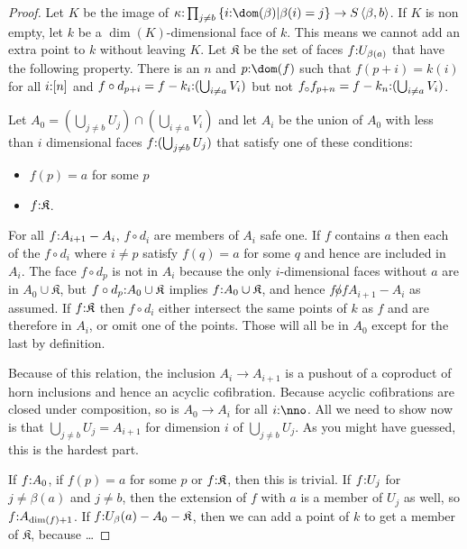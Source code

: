 \documentclass[csh.tex]{subfiles}
\begin{document}
\begin{proof}
Let $K$ be the image of $\kappa\of \prod_{j\neq b}\set{i\of\dom(\beta)|\beta(i)=j} \to S\tuplet{\beta,b}$. If $K$ is non empty, let $k$ be a $\dim(K)$-dimensional face of $k$. This means we cannot add an extra point to $k$ without leaving $K$.
Let $\mathfrak K$ be the set of faces $f\mathord : U_{\beta(a)}$ that have the following property. There is an $n$ and $p\of \dom(f)$ such that 
$f(p+i) = k(i)$ for all $i\mathord :[n]$ and
$f\circ d_{p+i} = f - k_i \mathord : (\bigcup_{i\neq a} V_i)$ but not $f_\circ f_{p+n} = f - k_n \mathord : (\bigcup_{i\neq a} V_i)$.

Let $A_0 = (\bigcup_{j\neq b} U_j) \cap (\bigcup_{i\neq a} V_i)$ and let $A_{i}$ be the union of $A_0$ with less than $i$ dimensional faces $f\mathord : (\bigcup_{j\neq b} U_j)$ that satisfy one of these conditions:
\begin{itemize}
\item $f(p) = a$ for some $p$
\item $f\mathord : \mathfrak K$.
\end{itemize}

For all $f\mathord : A_{i+1} - A_i$, $f\circ d_i$ are members of $A_i$ safe one. If $f$ contains $a$ then each of the $f\circ d_i$ where $i\neq p$ satisfy $f(q) = a$ for some $q$ and hence are included in $A_i$. The face $f\circ d_p$ is not in $A_i$ because the only $i$-dimensional faces without $a$ are in $A_0\cup\mathfrak K$, but $f\circ d_p \mathord : A_0\cup\mathfrak K$ implies $f\mathord : A_0\cup\mathfrak K$, and hence $f\not of A_{i+1} - A_i$ as assumed.
If $f\mathord :\mathfrak K$ then $f\circ d_i$ either intersect the same points of $k$ as $f$ and are therefore in $A_i$, or omit one of the points. Those will all be in $A_0$ except for the last by definition.

Because of this relation, the inclusion $A_i\to A_{i+1}$ is a pushout of a coproduct of horn inclusions and hence an acyclic cofibration. Because acyclic cofibrations are closed under composition, so is $A_0\to A_i$ for all $i\of \nno$. All we need to show now is that $\bigcup_{j\neq b} U_j = A_{i+1}$ for dimension $i$ of $\bigcup_{j\neq b} U_j$. As you might have guessed, this is the hardest part.

If $f\mathord : A_0$, if $f(p) = a$ for some $p$ or $f\mathord : \mathfrak K$, then this is trivial.
If $f\mathord : U_j$ for $j\neq \beta(a)$ and $j\neq b$, then the extension of $f$ with $a$ is a member of $U_j$ as well, so $f\mathord : A_{\dim(f)+1}$.
If $f\mathord : U_\beta(a) - A_0 - \mathfrak K$, then we can add a point of $k$
 to get a member of $\mathfrak K$, because \dots
\end{proof}
\end{document}

